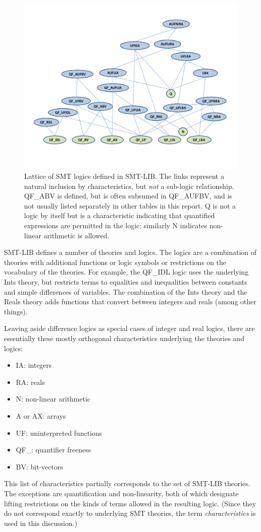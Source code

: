 \documentclass[smallcondensed]{svjour3}
\begin{document}
\begin{figure}
\centering
\includegraphics[width=\textwidth]{LogicLatticeN}
\caption{Lattice of SMT logics defined in SMT-LIB. The links represent a natural inclusion by characteristics, but {\it not} a sub-logic relationship. QF\_ABV is defined, but is often subsumed in QF\_AUFBV, and is not usually listed separately in other tables in this report. Q is not a logic by itself but is a characteristic indicating that quantified expressions are permitted in the logic; similarly N indicates non-linear arithmetic is allowed.}
\label{Fig:lattice}
\end{figure}

SMT-LIB defines a number of theories and logics. The logics are a combination of theories with additional functions or logic symbols or restrictions on the vocabulary of the theories. For example, the QF\_IDL logic uses the underlying Ints theory, but restricts terms to equalities and inequalities between constants and simple differences of variables.
The combination of the Ints theory and the Reals theory adds functions that convert between integers and reals (among other things). 

Leaving aside difference logics as special cases of integer and real logics, there are essentially these mostly orthogonal characteristics underlying the theories and logics:
\begin{itemize}[noitemsep,nolistsep] %
\item IA: integers 
\item RA: reals
\item N: non-linear arithmetic
\item A or AX: arrays
\item UF: uninterpreted functions
\item QF\_: quantifier freeness
\item BV: bit-vectors
\end{itemize}
This list of characteristics partially corresponds to the set of SMT-LIB theories. The exceptions are quantification and non-linearity, both of which designate lifting restrictions on the kinds of terms allowed in the resulting logic. (Since they do not correspond exactly to underlying SMT theories, the term {\em characteristics} is used in this discussion.)
\end{document}
